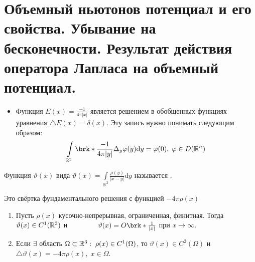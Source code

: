 \section{Объемный ньютонов потенциал и его свойства. Убывание на бесконечности. Результат
действия оператора Лапласа на объемный потенциал.}

\begin{itemize}
	\item Функция $E(x) = \frac{-1}{4\pi|x|}$ является решением в обобщенных функциях уравнения $\triangle E(x) = \delta (x)$. Эту запись нужно понимать следующим образом:
    $$
    \int\limits_{\mathbb{R}^3}\brk*{\frac{-1}{4\pi|y|}}\Delta_y \varphi (y) \mathrm{d}y = \varphi(0),\; \varphi \in D(\mathbb{R}^n)
    $$
\end{itemize}

\begin{definition}
	Функция $\vartheta (x)$ вида $\vartheta (x) = \int\limits_{\mathbb{R}^3}\frac{\rho (y)}{|x-y|}\mathrm{d}y$ называется \underline{\it {}}.
\end{definition}

\begin{remark} 
Это свёртка фундаментального решения с функцией $-4\pi\rho (x)$
\end{remark}

\begin{theorem}

	\begin{enumerate}
		\item Пусть $\rho (x)$ \text{---} кусочно-непрерывная, ограниченная, финитная. Тогда $\vartheta (x) \in C^1(\mathbb{R}^3)$ и $\qquad \qquad \vartheta (x) = O\brk*{\frac{1}{|x|}}$ при $x\rightarrow \infty $.
        \item Если $\exists$ область $\Omega \subset \mathbb{R}^3: \;\rho (x) \in C^1(\Omega)$, то $\vartheta (x) \in C^2 (\Omega)$ и $\triangle \vartheta (x) = -4\pi \rho (x), \;x \in \Omega$.
	\end{enumerate}
\end{theorem}

